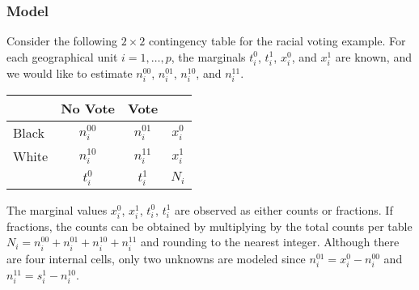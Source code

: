 \subsubsection{Model}
Consider the following $2 \times 2$ contingency table for the racial
voting example.  For each geographical unit $i = 1, \dots, p$, the
marginals $t_i^0$, $t_i^1$, $x_i^0$, and $x_i^1$ are known, and we
would like to estimate $n_i^{00}$, $n_i^{01}$, $n_i^{10}$, and $n_i^{11}$.

\begin{table}[!h]
  \begin{center}
    \begin{tabular}{l|cc|c}
      & No Vote  & Vote &         \\
      \hline
      Black & $n_i^{00}$  & $n_i^{01}$ & $x_i^0$   \\
      White & $n_i^{10}$  & $n_i^{11}$ & $x_i^1$ \\
      \hline
      & $t_i^0$ & $t_i^1$ & $N_i$         
    \end{tabular}
  \end{center}
\end{table}

\noindent The marginal values $x_{i}^0$, $x_{i}^1$, $t_i^0$,
$t_i^1$ are observed as either counts or fractions. If fractions, the
counts can be obtained by multiplying by the total counts per table
$N_i = n_i^{00} + n_i^{01} + n_i^{10} + n_i^{11}$ and rounding to the
nearest integer.  Although there are four internal cells, only two
unknowns are modeled since $n_i^{01} = x_i^0 - n_{i}^{00}$ and
$n_{i}^{11} = s_i^1 - n_{i}^{10}$.

